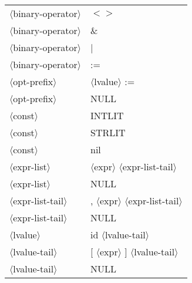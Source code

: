\documentclass[11pt, fleqn]{article}
\newcommand{\atag}[1]{$\langle$#1$\rangle$}
\begin{document}
\begin{longtable}{l|l}
\atag{binary-operator}			&	$<>$	\\
\atag{binary-operator}			&	\&	\\
\atag{binary-operator}			&	|	\\
\atag{binary-operator}			&	:=	\\
\atag{opt-prefix}				&	\atag{lvalue} :=		\\
\atag{opt-prefix}				&	NULL		\\
\atag{const}						&	INTLIT		\\
\atag{const}						&	STRLIT		\\
\atag{const}						&	nil		\\
\atag{expr-list}					&	\atag{expr} \atag{expr-list-tail}		\\
\atag{expr-list}					&	NULL		\\
\atag{expr-list-tail}			&	, \atag{expr} \atag{expr-list-tail}		\\
\atag{expr-list-tail}			&	NULL		\\
\atag{lvalue}					&	id \atag{lvalue-tail}		\\
\atag{lvalue-tail}				&	[ \atag{expr} ] \atag{lvalue-tail}		\\
\atag{lvalue-tail}				&	NULL		\\
\end{longtable}
\end{document}
